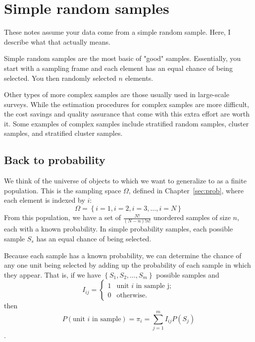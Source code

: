 
\chapter{Simple random samples}
These notes assume your data come from a simple random sample. Here, I describe what that actually means.

Simple random samples are the most basic of "good" samples. Essentially, you start with a sampling frame and each element has an equal chance of being selected. You then randomly selected $n$ elements.

Other types of more complex samples are those usually used in large-scale surveys. While the estimation procedures for complex samples are more difficult, the cost savings and quality assurance that come with this extra effort are worth it. Some examples of complex samples include stratified random samples, cluster samples, and stratified cluster samples.

\section{Back to probability}

We think of the universe of objects to which we want to generalize to as a finite population. This is the sampling space $\Omega$, defined in Chapter~\ref{sec:prob}, where each element is indexed by $i$:
\[
\Omega = \left\{i=1, i=2, i=3,\ldots, i=N\right\}
\]
From this population, we have a set of $\frac{N!}{\left(N-n\right)!n!}$ unordered samples of size $n$, each with a known probability. In simple probability samples, each possible sample $S_s$ has an equal chance of being selected.

Because each sample has a known probability, we can determine the chance of any one unit being selected by adding up the probability of each sample in which they appear. That is, if we have $\left\{S_1, S_2, \ldots , S_m\right\}$ possible samples and
\begin{equation}
I_{ij} = \left\{ \begin{array}{ll}
     1 & \mbox{unit } i \mbox{ in sample j};\\
     0 & \mbox{otherwise}.\end{array} \right.
\end{equation}
then
\begin{equation}
P\left(\mbox{unit } i \mbox{ in sample}\right) = \pi_i = \sum_{j=1}^m I_{ij}P\left(S_j\right)
\end{equation}.

